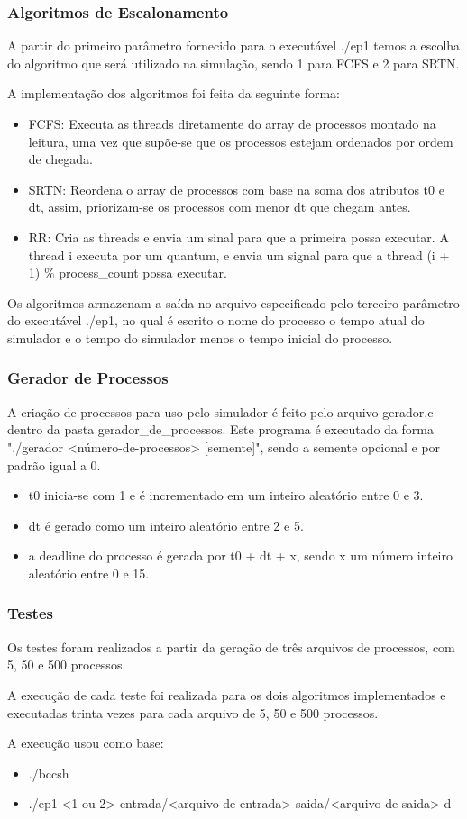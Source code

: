 \documentclass{beamer}
\begin{document}
\begin{frame}
\frametitle{Algoritmos de Escalonamento}
A partir do primeiro parâmetro fornecido para o executável ./ep1 temos a escolha do algoritmo que será utilizado na
    simulação, sendo 1 para FCFS e 2 para SRTN.

A implementação dos algoritmos foi feita da seguinte forma:
\begin{itemize}
    \item FCFS: Executa as threads diretamente do array de processos montado na leitura, uma vez que supõe-se que os processos estejam ordenados por ordem de chegada.
    \item SRTN: Reordena o array de processos com base na soma dos atributos t0 e dt, assim, priorizam-se os processos
        com menor dt que chegam antes.
    \item RR: Cria as threads e envia um sinal para que a primeira possa executar. A thread i executa por um quantum, e envia um signal 
    para que a thread (i + 1) \% process\_count possa executar. 

\end{itemize}

Os algoritmos armazenam a saída no arquivo especificado pelo terceiro parâmetro do executável ./ep1, no qual é escrito o
nome do processo o tempo atual do simulador e o tempo do simulador menos o tempo inicial do processo.

\end{frame}

\begin{frame}
\frametitle{Gerador de Processos}
A criação de processos para uso pelo simulador é feito pelo arquivo gerador.c dentro da pasta gerador\_de\_processos.
    Este programa é executado da forma "./gerador <número-de-processos> [semente]", sendo a semente opcional e por
    padrão igual a 0.
\begin{itemize}
    \item t0 inicia-se com 1 e é incrementado em um inteiro aleatório entre 0 e 3.
    \item dt é gerado como um inteiro aleatório entre 2 e 5.
    \item a deadline do processo é gerada por t0 + dt + x, sendo x um número inteiro aleatório entre 0 e 15.
\end{itemize}
\end{frame}

\begin{frame}
\frametitle{Testes}
Os testes foram realizados a partir da geração de três arquivos de processos, com 5, 50 e 500 processos.

A execução de cada teste foi realizada para os dois algoritmos implementados e executadas trinta vezes para cada arquivo
de 5, 50 e 500 processos.

A execução usou como base:
\begin{itemize}
    \item ./bccsh
    \item ./ep1 <1 ou 2> entrada/<arquivo-de-entrada> saida/<arquivo-de-saida> d
\end{itemize}

\end{frame}
\end{document}

